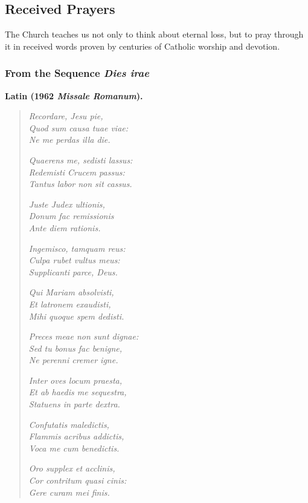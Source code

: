 \subsection*{Received Prayers}

The Church teaches us not only to think about eternal loss, but to pray through it in received words proven by centuries of Catholic worship and devotion.

\subsubsection*{From the Sequence \textit{Dies irae}}

\textbf{Latin (1962 \textit{Missale Romanum}).}

\begin{quote}
\textit{Recordare, Jesu pie,\\
Quod sum causa tuae viae:\\
Ne me perdas illa die.}

\textit{Quaerens me, sedisti lassus:\\
Redemisti Crucem passus:\\
Tantus labor non sit cassus.}

\textit{Juste Judex ultionis,\\
Donum fac remissionis\\
Ante diem rationis.}

\textit{Ingemisco, tamquam reus:\\
Culpa rubet vultus meus:\\
Supplicanti parce, Deus.}

\textit{Qui Mariam absolvisti,\\
Et latronem exaudisti,\\
Mihi quoque spem dedisti.}

\textit{Preces meae non sunt dignae:\\
Sed tu bonus fac benigne,\\
Ne perenni cremer igne.}

\textit{Inter oves locum praesta,\\
Et ab haedis me sequestra,\\
Statuens in parte dextra.}

\textit{Confutatis maledictis,\\
Flammis acribus addictis,\\
Voca me cum benedictis.}

\textit{Oro supplex et acclinis,\\
Cor contritum quasi cinis:\\
Gere curam mei finis.}
\end{quote}

